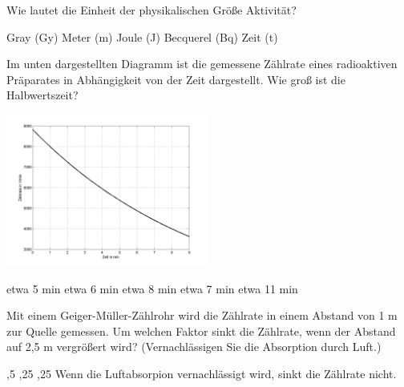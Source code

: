 \documentclass[11pt]{exam}
\begin{document}
\setlength{\voffset}{-0.5in}
\setlength{\headsep}{5pt}

\hspace{2mm}
 \hspace{5mm}
\vspace{4mm}

\begin{questions}

\question Wie lautet die Einheit der physikalischen Größe Aktivität?

\begin{choices}
	\choice Gray (Gy)
	\choice Meter (m)
	\choice Joule (J)
	\choice Becquerel (Bq)
	\choice Zeit (t)
\end{choices}

\vspace{3mm}\question Im unten dargestellten Diagramm ist die gemessene Zählrate eines radioaktiven Präparates in Abhängigkeit von der Zeit dargestellt. Wie groß ist die Halbwertszeit?

\includegraphics[width=0.5\textwidth]{../../../questions/K/images/zerfall2.png}

\begin{choices}
	\choice etwa 5 min
	\choice etwa 6 min
	\choice etwa 8 min
	\choice etwa 7 min
	\choice etwa 11 min
\end{choices}

\vspace{3mm}\question Mit einem Geiger-Müller-Zählrohr wird die Zählrate in einem Abstand von 1 m zur Quelle gemessen. Um welchen Faktor sinkt die Zählrate, wenn der Abstand auf 2,5 m vergrößert wird? (Vernachlässigen Sie die Absorption durch Luft.)

\begin{choices}
	,5
	,25
	,25
	\choice Wenn die Luftabsorpion vernachlässigt wird, sinkt die Zählrate nicht.
\end{choices}


\end{questions}
\end{document}
